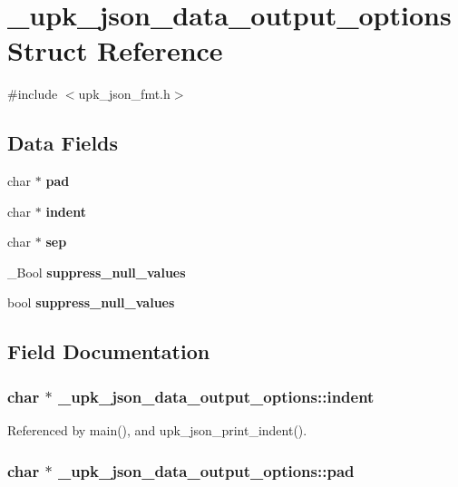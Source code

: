 \section{\_\-upk\_\-json\_\-data\_\-output\_\-options Struct Reference}
\label{struct__upk__json__data__output__options}


{\ttfamily \#include $<$upk\_\-json\_\-fmt.h$>$}

\subsection*{Data Fields}
\begin{DoxyCompactItemize}
\item 
char $\ast$ {\bf pad}
\item 
char $\ast$ {\bf indent}
\item 
char $\ast$ {\bf sep}
\item 
\_\-Bool {\bf suppress\_\-null\_\-values}
\item 
bool {\bf suppress\_\-null\_\-values}
\end{DoxyCompactItemize}


\subsection{Field Documentation}
\subsubsection[{indent}]{\setlength{\rightskip}{0pt plus 5cm}char $\ast$ {\bf \_\-upk\_\-json\_\-data\_\-output\_\-options::indent}}\label{struct__upk__json__data__output__options_a460c4bbe712d5dc06fca05a70ffd0760}


Referenced by main(), and upk\_\-json\_\-print\_\-indent().

\subsubsection[{pad}]{\setlength{\rightskip}{0pt plus 5cm}char $\ast$ {\bf \_\-upk\_\-json\_\-data\_\-output\_\-options::pad}}\label{struct__upk__json__data__output__options_ab6bf43a5eb659ce13dc4f8173f5b2b32}


